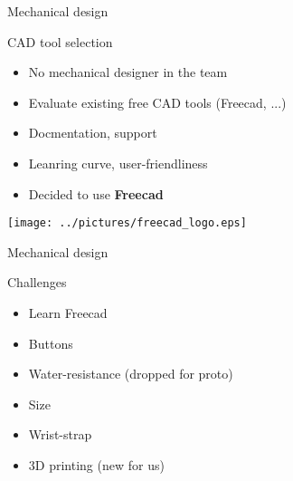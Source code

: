 \documentclass[compress,red]{beamer}
\begin{document}
\begin{frame}{Mechanical design}

  \begin{block}{CAD tool selection}
    \begin{itemize}
    \item No mechanical designer in the team
    \item Evaluate existing free CAD tools (Freecad, ...)
    \item Docmentation, support
    \item Leanring curve, user-friendliness
    \end{itemize}
  \end{block}

  \begin{itemize}
  \item Decided to use \textbf{Freecad}
  \end{itemize}

  \begin{center}
    \texttt{[image: ../pictures/freecad\_logo.eps]}
  \end{center}

\end{frame}

\begin{frame}{Mechanical design}

  \begin{block}{Challenges}
    \begin{itemize}
    \item Learn Freecad
    \item Buttons
    \item Water-resistance (dropped for proto)
    \item Size
    \item Wrist-strap
    \item 3D printing (new for us)
    \end{itemize}
  \end{block}

  \note[item]{}

\end{frame}
\end{document}
